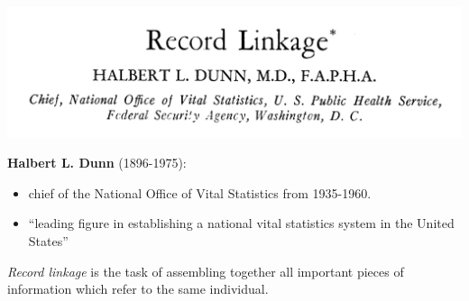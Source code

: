 \documentclass[compress]{beamer}
\newcommand{\1}[1]{\mathbb{I}\!\left[#1\right]} %
\theoremstyle{plain}
\begin{document}
\begin{frame}
    
\begin{center}
    \includegraphics[width=0.8\linewidth]{finalFigures/Dunn-0}
\end{center}

\textbf{Halbert L. Dunn} (1896-1975):

\begin{itemize}
    \item chief of the National Office of Vital Statistics from 1935-1960.
    \item ``leading figure in establishing a national vital statistics system in the United States''
\end{itemize}

    
\end{frame}

\begin{frame}


\emph{Record linkage} is the task of assembling together all important pieces of information which refer to the same individual.

\end{frame}
\end{document}
